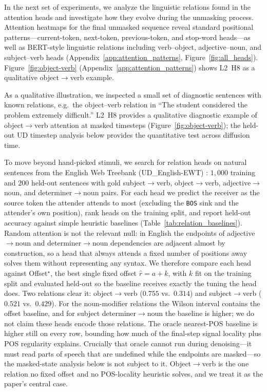 \documentclass{article} %
\begin{document}
In the next set of experiments, we analyze the linguistic relations found in the attention heads and investigate how they evolve during the unmasking process. Attention heatmaps for the final unmasked sequence reveal standard positional patterns---current-token, next-token, previous-token, and stop-word heads---as well as BERT-style linguistic relations \citep{clark-etal-2019-bert} including verb--object, adjective--noun, and subject--verb heads (Appendix~\ref{app:attention_patterns}, Figure~\ref{fig:all_heads}). Figure~\ref{fig:object-verb} (Appendix~\ref{app:attention_patterns}) shows L2~H8 as a qualitative object$\to$verb example.

As a qualitative illustration, we inspected a small set of diagnostic sentences with known relations, e.g.\ the object--verb relation in ``The student considered the problem extremely difficult.'' L2~H8 provides a qualitative diagnostic example of object$\to$verb attention at masked timesteps (Figure~\ref{fig:object-verb}); the held-out UD timestep analysis below provides the quantitative test across diffusion time.

To move beyond hand-picked stimuli, we search for relation heads on natural sentences from the English Web Treebank (UD\_English-EWT) \citep{nivre2020universal}: $1{,}000$ training and $200$ held-out sentences with gold subject$\to$verb, object$\to$verb, adjective$\to$noun, and determiner$\to$noun pairs. For each head we predict the receiver as the source token the attender attends to most (excluding the \texttt{BOS} sink and the attender's own position), rank heads on the training split, and report held-out accuracy against simple heuristic baselines (Table~\ref{tab:relation_baselines}). Random attention is not the relevant null: in English the endpoints of adjective$\to$noun and determiner$\to$noun dependencies are adjacent almost by construction, so a head that always attends a fixed number of positions away solves them without representing any syntax. We therefore compare each head against Offset$^\star$, the best single fixed offset $\hat{r}=a+k$, with $k$ fit on the training split and evaluated held-out so the baseline receives exactly the tuning the head does. Two relations clear it: object$\to$verb ($0.755$ vs.\ $0.314$) and subject$\to$verb ($0.521$ vs.\ $0.429$). For the noun-modifier relations the Wilson interval contains the offset baseline, and for subject determiner$\to$noun the baseline is higher; we do not claim these heads encode those relations. The oracle nearest-POS baseline is higher still on every row, bounding how much of the final-step signal locality plus POS regularity explains. Crucially that oracle cannot run during denoising---it must read parts of speech that are undefined while the endpoints are masked---so the masked-state analysis below is not subject to it. Object$\to$verb is the one relation no fixed offset and no POS-locality heuristic solves, and we treat it as the paper's central case.
\end{document}
